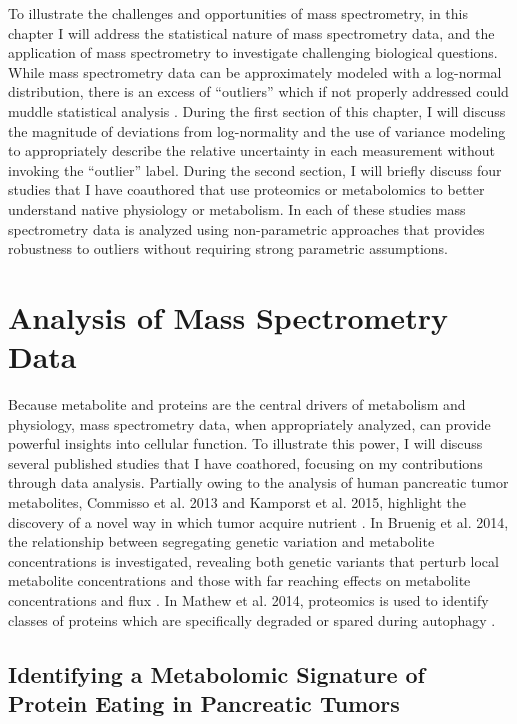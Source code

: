 To illustrate the challenges and opportunities of mass spectrometry, in this chapter I will address the statistical nature of mass spectrometry data, and the application of mass spectrometry to investigate challenging biological questions.  While mass spectrometry data can be approximately modeled with a log-normal distribution, there is an excess of ``outliers'' which if not properly addressed could muddle statistical analysis \cite{Nesvizhskii:2005jp, Cox:2008ir}. During the first section of this chapter, I will discuss the magnitude of deviations from log-normality and the use of variance modeling to appropriately describe the relative uncertainty in each measurement without invoking the ``outlier'' label.  During the second section, I will briefly discuss four studies that I have coauthored that use proteomics or metabolomics to better understand native physiology or metabolism. In each of these studies mass spectrometry data is analyzed using non-parametric approaches that provides robustness to outliers without requiring strong parametric assumptions.




\section{Analysis of Mass Spectrometry Data}

Because metabolite and proteins are the central drivers of metabolism and physiology, mass spectrometry data, when appropriately analyzed, can provide powerful insights into cellular function.  To illustrate this power, I will discuss several published studies that I have coathored, focusing on my contributions through data analysis. Partially owing to the analysis of human pancreatic tumor metabolites, Commisso et al. 2013 and Kamporst et al. 2015, highlight the discovery of a novel way in which tumor acquire nutrient \cite{Commisso:2013hz, Kamphorst:2015cc}.  In Bruenig et al. 2014, the relationship between segregating genetic variation and metabolite concentrations is investigated, revealing both genetic variants that perturb local metabolite concentrations and those with far reaching effects on metabolite concentrations and flux \cite{Breunig:2014bu}.  In Mathew et al. 2014, proteomics is used to identify classes of proteins which are specifically degraded or spared during autophagy \cite{Mathew:2014hz}.

\subsection{Identifying a Metabolomic Signature of Protein Eating in Pancreatic Tumors}

